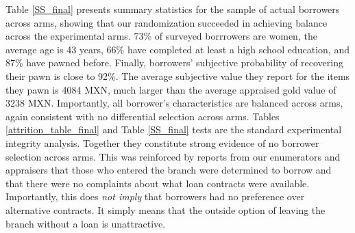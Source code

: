\documentclass[12pt, a4paper, colorinlistoftodos]{article}
\begin{document}
Table \ref{SS_final} presents summary statistics for the sample of actual borrowers across arms, showing that our randomization succeeded in achieving balance across the experimental arms. %
73\% of surveyed borrrowers are women, the average age is 43 years, 66\% have completed at least a high school education, and 87\% have pawned before. Finally, borrowers' subjective probability of recovering their pawn is close to 92\%. The average subjective value they report for the items they pawn is 4084 MXN, much larger than the average appraised gold value of 3238 MXN. %
Importantly, all borrower's characteristics are balanced across arms, again consistent with no differential selection across arms. Tables \ref{attrition_table_final} and Table \ref{SS_final}  tests are the standard experimental integrity analysis. Together they constitute strong evidence of no borrower selection across arms. This was reinforced by reports from our enumerators and appraisers that those who entered the branch were determined to borrow and that there were no complaints about what loan contracts were available. Importantly, this does \emph{not imply} that borrowers had no preference over alternative contracts. It simply means that the outside option of leaving the branch without a loan is unattractive.

\end{document}
